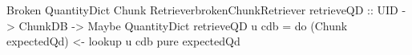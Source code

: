 \begin{pseudohaskell}{Broken QuantityDict Chunk Retriever}{brokenChunkRetriever}
retrieveQD :: UID -> ChunkDB -> Maybe QuantityDict
retrieveQD u cdb = do
    (Chunk expectedQd) <- lookup u cdb
    pure expectedQd
\end{pseudohaskell}
